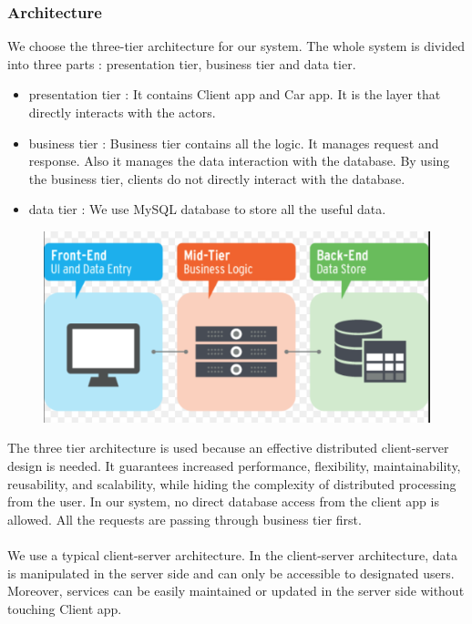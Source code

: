 \documentclass{article}
\begin{document}
	\subsubsection{Architecture}
	We choose the three-tier architecture for our system. The whole system is divided into three parts : presentation tier, business tier and data tier.
	\begin{itemize}
		\item presentation tier : It contains Client app and Car app. It is the layer that directly interacts with the actors. 
		\item business tier : Business tier contains all the logic. It manages request and response. Also it manages the data interaction with the database. By using the business tier, clients do not directly interact with the database. 
		\item data tier : We use MySQL database to store all the useful data.
	\end{itemize}
	\begin{figure}[h]
	\includegraphics[width=\textwidth]{architecture}
	\end{figure}
	The three tier architecture is used because an effective distributed client-server design is needed. It guarantees increased performance, flexibility, maintainability, reusability, and scalability, while hiding the complexity of distributed processing from the user. In our system, no direct database access from the client app is allowed. All the requests are passing through business tier first.
	\\
	\\We use a typical client-server architecture. In the client-server architecture, data is manipulated in the server side and can only be accessible to designated users. Moreover, services can be easily maintained or updated in the server side without touching Client app.
	\\
\end{document}
